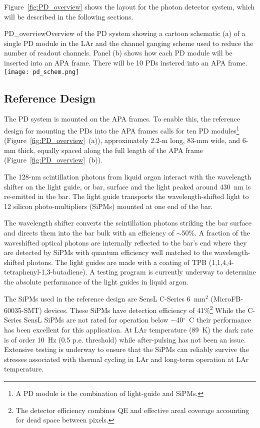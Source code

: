 Figure~\ref{fig:PD_overview} shows the layout for the photon detector
system, which will be described in the following sections.
\begin{cdrfigure}[PD Overview]{PD_overview}{Overview of the PD
    system showing a cartoon schematic (a) of a single PD module
    in the LAr and the channel ganging scheme used to reduce the
    number of readout channels. Panel (b) shows how each PD module
    will be inserted into an APA frame. There will be 10 PDs instered
    into an APA frame.}
\texttt{[image: pd\_schem.png]}
\end{cdrfigure}

\subsection{Reference Design}
\label{sec:detectors-fd-ref-pd-refsystem}   %

The PD system is mounted on the APA frames.  To enable this, the
reference design for mounting the PDs into the APA frames calls for
ten PD modules\footnote{A PD module is the combination of light-guide
and SiPMs.} (Figure~\ref{fig:PD_overview}~(a)), approximately 2.2-m
long, 83-mm wide, and 6-mm thick, equally spaced along the full length
of the APA frame (Figure~\ref{fig:PD_overview}~(b)).

The 128-nm scintillation photons from liquid argon interact with the
wavelength shifter on the light guide, or bar, surface and the light
peaked around 430~nm is re-emitted in the bar. The light guide
transports the wavelength-shifted light to 12 silicon
photo-multipliers (SiPMs) mounted at one end of the bar.

The wavelength shifter converts the scintillation photons striking the
bar surface and directs them into the bar bulk with an efficiency of
$\sim$50\%.  A fraction of the waveshifted optical photons are
internally reflected to the bar's end where they are detected by SiPMs
with quantum efficiency well matched to the wavelength-shifted
photons. The light guides are made with a coating of TPB
(1,1,4,4-tetraphenyl-1,3-butadiene). A testing program is currently
underway to determine the absolute performance of the light guides in
liquid argon.

The SiPMs used in the reference design are SensL C-Series 6~mm$^2$
(MicroFB-60035-SMT) devices. These SiPMs have detection efficiency of
41\%\footnote{The detector efficiency combines QE and effective areal
  coverage accounting for dead space between pixels.} While the
C-Series SensL SiPMs are not rated for operation below
$-$40$^{\circ}$~C their performance has been excellent for this
application. At LAr temperature (89~K) the dark rate is of order 10~Hz
(0.5 p.e. threshold) while after-pulsing has not been an
issue. Extensive testing is underway to ensure that the SiPMs can
reliably survive the stresses associated with thermal cycling in LAr
and long-term operation at LAr temperature.

